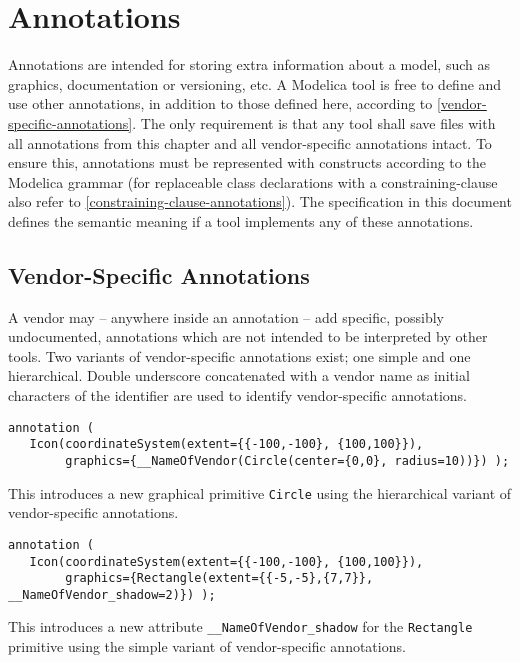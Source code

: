 
\chapter{Annotations}

Annotations are intended for storing extra information about a model,
such as graphics, documentation or versioning, etc. A Modelica tool is
free to define and use other annotations, in addition to those defined
here, according to \autoref{vendor-specific-annotations}. The only requirement is that any tool
shall save files with all annotations from this chapter and all
vendor-specific annotations intact. To ensure this, annotations must be
represented with constructs according to the Modelica grammar (for
replaceable class declarations with a constraining-clause also refer to
\autoref{constraining-clause-annotations}). The specification in this document defines the
semantic meaning if a tool implements any of these annotations.

\section{Vendor-Specific Annotations}

A vendor may -- anywhere inside an annotation -- add specific, possibly
undocumented, annotations which are not intended to be interpreted by
other tools. Two variants of vendor-specific annotations exist; one
simple and one hierarchical. Double underscore concatenated with a
vendor name as initial characters of the identifier are used to identify
vendor-specific annotations.

\begin{example}
\begin{lstlisting}[language=modelica]
annotation (
   Icon(coordinateSystem(extent={{-100,-100}, {100,100}}),
        graphics={__NameOfVendor(Circle(center={0,0}, radius=10))}) );
\end{lstlisting}
This introduces a new graphical primitive \lstinline!Circle! using the
hierarchical variant of vendor-specific annotations.
\begin{lstlisting}[language=modelica]
annotation (
   Icon(coordinateSystem(extent={{-100,-100}, {100,100}}),
        graphics={Rectangle(extent={{-5,-5},{7,7}}, __NameOfVendor_shadow=2)}) );
\end{lstlisting}
This introduces a new attribute \lstinline!__NameOfVendor_shadow!
for the \lstinline!Rectangle! primitive using the simple variant of
vendor-specific annotations.
\end{example}

